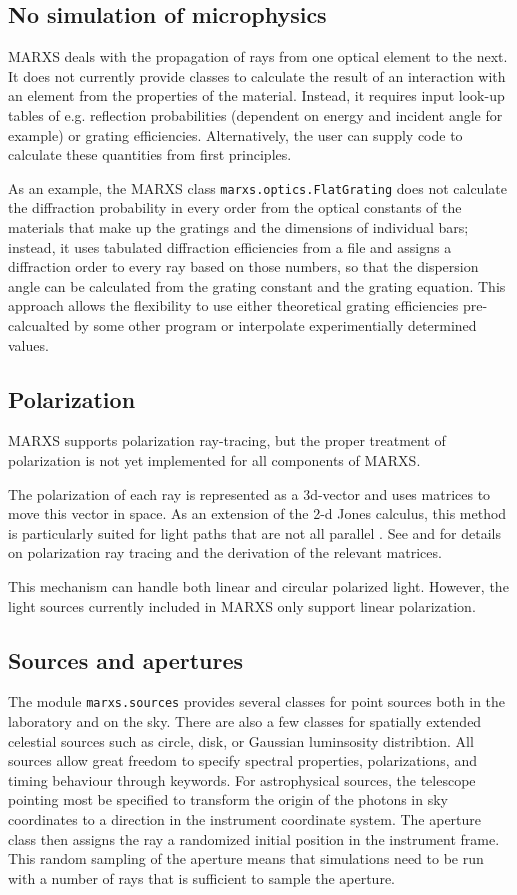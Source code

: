 \documentclass[twocolumn]{aastex61}
\begin{document}
\subsection{No simulation of microphysics}
MARXS deals with the propagation of rays from one optical element to the
next. It does not currently provide classes to calculate the result of an
interaction with an element from the properties of the material. Instead, it
requires input look-up tables of e.g. reflection probabilities (dependent on
energy and incident angle for example) or grating efficiencies. Alternatively,
the user can supply code to calculate these quantities from first principles.

As an example, the MARXS class \texttt{marxs.optics.FlatGrating} does not
calculate the diffraction probability in every order from the optical constants
of the materials that make up the gratings and the dimensions of individual
bars; instead, it uses tabulated diffraction efficiencies from a file and
assigns a diffraction order to every ray based on those numbers, so that the
dispersion angle can be calculated from the grating constant and the grating
equation. This approach allows the flexibility to use either theoretical
grating efficiencies pre-calcualted by some other program or interpolate
experimentially determined values.


\subsection{Polarization}
MARXS supports polarization ray-tracing, but the proper treatment of
polarization is not yet implemented for all components of MARXS.

The polarization of each ray is represented as a 3d-vector and uses matrices to
move this vector in space. As an extension of the 2-d Jones calculus, this
method is particularly suited for light paths that are not all parallel
\citep{doi:10.1117/12.138816}. See \citet{Yun:11} and \citet{Yunthesis} for
details on polarization ray tracing and the derivation of the relevant
matrices.

This mechanism can handle both linear and circular polarized light. However,
the light sources currently included in MARXS only support linear polarization.


\subsection{Sources and apertures}
The module \texttt{marxs.sources} provides several classes for point sources
both in the laboratory and on the sky. There are also a few classes for
spatially extended celestial sources such as circle, disk, or Gaussian
luminsosity distribtion. All sources allow great freedom to specify spectral
properties, polarizations, and timing behaviour through keywords. For
astrophysical sources, the telescope pointing most be specified to transform
the origin of the photons in sky coordinates to a direction in the instrument
coordinate system. The aperture class then assigns the ray a randomized initial
position in the instrument frame. This random sampling of the aperture means
that simulations need to be run with a number of rays that is sufficient to
sample the aperture.
\end{document}
